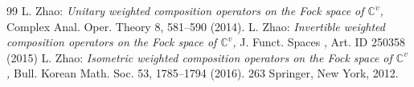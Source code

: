 \documentclass[reqno]{amsart}
\theoremstyle{remark}
\theoremstyle{Definition}
\theoremstyle{remark}
\numberwithin{equation}{section}
\begin{document}
\begin{thebibliography}{99}
  { L. Zhao: }{\it Unitary weighted composition operators on the Fock space of $\mathbb{C}^{v}$, } 
{ Complex Anal. Oper. Theory } { 8}, {581--590} (2014).
 { L. Zhao: }{\it Invertible weighted composition operators on the Fock space of $\mathbb{C}^{v}$, }
{ J. Funct. Spaces }, Art. ID 250358 (2015)
 { L. Zhao: }{\it Isometric weighted composition operators on the Fock space of $\mathbb{C}^{v}$, }
{ Bull. Korean Math. Soc. } 53, {1785--1794} (2016).
 { 263} {Springer, New York, 2012.}
\end{thebibliography}
\end{document}
